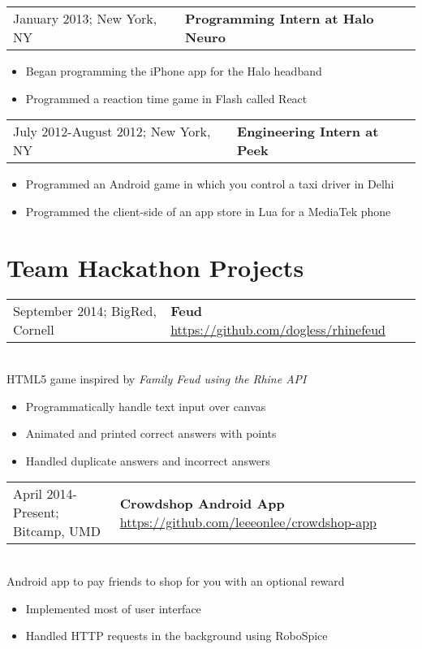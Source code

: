 \documentclass[letterpaper,10pt]{article} %
\begin{document}
\begin{tabular}{@{}p{3in}l}
    January 2013; New York, NY & \textbf{Programming Intern at Halo Neuro}
\end{tabular}
\begin{itemize}
    \item Began programming the iPhone app for the Halo headband
    \item Programmed a reaction time game in Flash called React
\end{itemize}

\begin{tabular}{@{}p{3in}l}
    July 2012-August 2012; New York, NY & \textbf{Engineering Intern at Peek}
\end{tabular}
\begin{itemize}
    \item Programmed an Android game in which you control a taxi driver in Delhi
    \item Programmed the client-side of an app store in Lua for a MediaTek phone
\end{itemize}

\section{Team Hackathon Projects}

\begin{tabular}{@{}p{3in}l}
    September 2014; BigRed, Cornell & \textbf{Feud} \footnotesize{\url{https://github.com/dogless/rhinefeud}}
\end{tabular} \\
HTML5 game inspired by \em{Family Feud} using the Rhine API
\begin{itemize}
    \item Programmatically handle text input over canvas
    \item Animated and printed correct answers with points
    \item Handled duplicate answers and incorrect answers
\end{itemize}

\begin{tabular}{@{}p{3in}l}
    April 2014-Present; Bitcamp, UMD & \textbf{Crowdshop Android App} \footnotesize{\url{https://github.com/leeeonlee/crowdshop-app}}
\end{tabular} \\
Android app to pay friends to shop for you with an optional reward
\begin{itemize}
    \item Implemented most of user interface
    \item Handled HTTP requests in the background using RoboSpice
\end{itemize}
\end{document}
